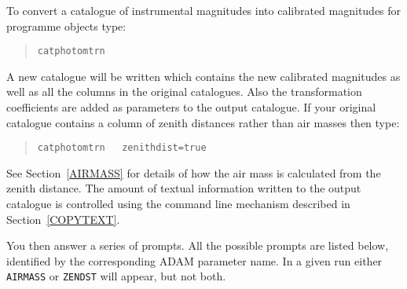 \documentclass[twoside,11pt]{article}
\renewcommand{\_}{\texttt{\symbol{95}}}
\begin{document}
To convert a catalogue of instrumental magnitudes into calibrated
magnitudes for programme objects type:

\begin{verse}
{\tt catphotomtrn}
\end{verse}

A new catalogue will be written which contains the new calibrated
magnitudes as well as all the columns in the original catalogues.  Also
the transformation coefficients are added as parameters to the output
catalogue.  If your original catalogue contains a column of zenith
distances rather than air masses then type:

\begin{verse}
{\tt catphotomtrn ~ zenithdist=true}
\end{verse}

See Section~\ref{AIRMASS} for details of how the air mass is calculated
from the zenith distance.  The amount of textual information written to
the output catalogue is controlled using the command line mechanism
described in Section~\ref{COPYTEXT}.

You then answer a series of prompts.  All the possible prompts are
listed below, identified by the corresponding ADAM parameter name.  In
a given run either {\tt AIRMASS} or {\tt ZENDST} will appear, but not
both.
\end{document}
